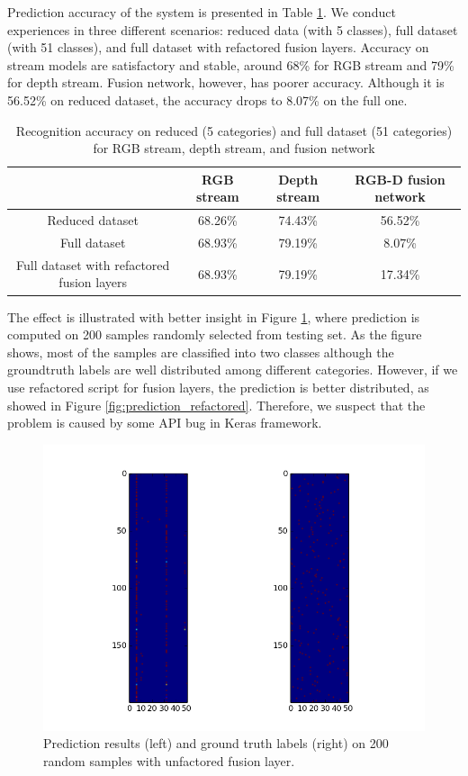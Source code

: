 Prediction accuracy of the system is presented in Table \ref{tab:result}. We conduct experiences in three different scenarios: reduced data (with 5 classes), full dataset (with 51 classes), and full dataset with refactored fusion layers. Accuracy on stream models are satisfactory and stable, around 68\% for RGB stream and 79\% for depth stream. Fusion network, however, has poorer accuracy. Although it is 56.52\% on reduced dataset, the accuracy drops to 8.07\% on the full one. 

\begin{table}
	\centering
	\caption{Recognition accuracy on reduced (5 categories) and full dataset (51 categories) for RGB stream, depth stream, and fusion network}
	\label{tab:result}
	\begin{tabular}{|c|c|c|c|}
		\hline
		& RGB stream & Depth stream & RGB-D fusion network \\ \hline
		Reduced dataset & 68.26\% & 74.43\% & 56.52\% \\ 
		Full dataset & 68.93\% & 79.19\% & 8.07\% \\ 
		Full dataset with refactored fusion layers & 68.93\% & 79.19\% & 17.34\% \\ \hline
	\end{tabular}
\end{table}

The effect is illustrated with better insight in Figure \ref{fig:prediction}, where prediction is computed on 200 samples randomly selected from testing set. As the figure shows, most of the samples are classified into two classes although the groundtruth labels are well distributed among different categories. However, if we use refactored script for fusion layers, the prediction is better distributed, as showed in Figure \ref{fig:prediction_refactored}. Therefore, we suspect that the problem is caused by some API bug in Keras framework.

\begin{figure}
	\centering
	\includegraphics[width=\textwidth]{img/prediction.png}
	\caption{Prediction results (left) and ground truth labels (right) on 200 random samples with unfactored fusion layer.}
	\label{fig:prediction}
\end{figure}

